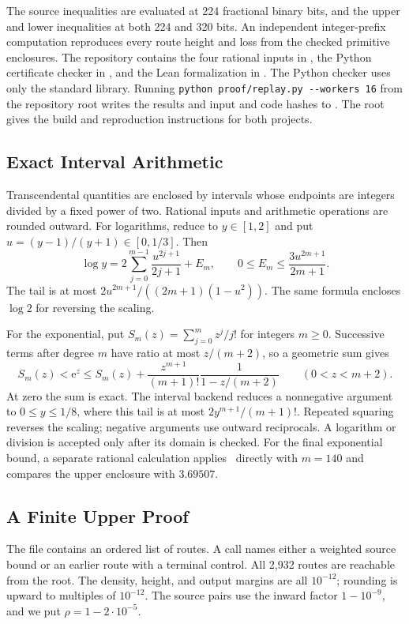 \documentclass[11pt]{article}
\theoremstyle{definition}
\newcommand{\e}{\mathrm e}
\begin{document}
The source inequalities are evaluated at 224 fractional binary bits, and the upper and lower inequalities at both 224 and 320 bits.
An independent integer-prefix computation reproduces every route height and loss from the checked primitive enclosures.
The repository contains the four rational inputs in , the Python certificate checker in , and the Lean formalization in .
The Python checker uses only the standard library. Running \texttt{python proof/replay.py -{}-workers 16} from the repository root writes the results and input and code hashes to .
The root  gives the build and reproduction instructions for both projects.

\subsection{Exact Interval Arithmetic}\label{sec:arithmetic}
Transcendental quantities are enclosed by intervals whose endpoints are integers divided by a fixed power of two. Rational inputs and arithmetic operations are rounded outward. For logarithms, reduce to \(y\in[1,2]\) and put \(u=(y-1)/(y+1)\in[0,1/3]\). Then
\begin{equation}\label{eq:logseries}
 \log y=2\sum_{j=0}^{m-1}\frac{u^{2j+1}}{2j+1}+E_m,
 \qquad 0\le E_m\le\frac{3u^{2m+1}}{2m+1}.
\end{equation}
The tail is at most \(2u^{2m+1}/((2m+1)(1-u^2))\). The same formula encloses \(\log2\) for reversing the scaling.

For the exponential, put $S_m(z)=\sum_{j=0}^m z^j/j!$ for integers $m\ge0$.
Successive terms after degree $m$ have ratio at most $z/(m+2)$, so a geometric sum gives
\begin{equation}\label{eq:expseries}
 S_m(z)<\e^z\le S_m(z)+
 \frac{z^{m+1}}{(m+1)!}\frac1{1-z/(m+2)}
 \qquad(0<z<m+2).
\end{equation}
At zero the sum is exact.
The interval backend reduces a nonnegative argument to $0\le y\le1/8$, where this tail is at most $2y^{m+1}/(m+1)!$.
Repeated squaring reverses the scaling; negative arguments use outward reciprocals.
A logarithm or division is accepted only after its domain is checked.
For the final exponential bound, a separate rational calculation applies~ directly with $m=140$ and compares the upper enclosure with $3.69507$.

\subsection{A Finite Upper Proof}
The file  contains an ordered list of routes.
A call names either a weighted source bound or an earlier route with a terminal control.
All 2,932 routes are reachable from the root.
The density, height, and output margins are all $10^{-12}$; rounding is upward to multiples of $10^{-12}$.
The source pairs use the inward factor $1-10^{-9}$, and we put $\rho=1-2\cdot10^{-5}$.
\end{document}
